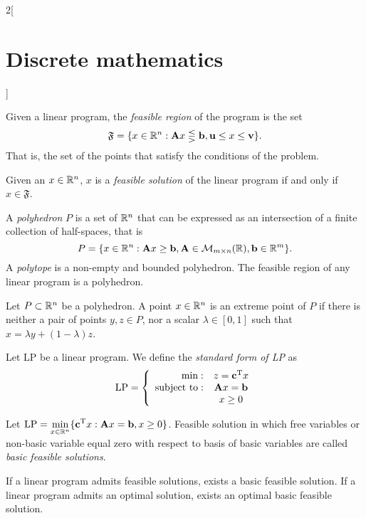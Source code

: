 \documentclass[../../../main.tex]{subfiles}
\begin{document}
\begin{multicols}{2}[\section{Discrete mathematics}]
    \begin{definition}
        Given a linear program, the \textit{feasible region} of the program is the set $$\mathfrak{F}=\{x\in\mathbb{R} ^n:\vb{A}x\lesseqgtr \vb{b},\vb{u}\leq x\leq \vb{v}\}.$$ That is, the set of the points that satisfy the conditions of the problem.
    \end{definition}
    \begin{prop}
        Given an $x\in\mathbb{R} ^n$, $x$ is a \textit{feasible solution} of the linear program if and only if $x\in\mathfrak{F}$.
    \end{prop}
    \begin{definition}
        A \textit{polyhedron} $P$ is a set of $\mathbb{R} ^n$ that can be expressed as an intersection of a finite collection of half-spaces, that is $$P=\{x\in\mathbb{R} ^n:\vb{A}x\geq \vb{b}, \vb{A}\in\mathcal{M}_{m\times n}(\mathbb{R} ),\vb{b}\in\mathbb{R} ^m\}.$$ A \textit{polytope} is a non-empty and bounded polyhedron. The feasible region of any linear program is a polyhedron.
    \end{definition}
    \begin{definition}
        Let $P\subset\mathbb{R} ^n$ be a polyhedron. A point $x\in\mathbb{R} ^n$ is an extreme point of $P$ if there is neither a pair of points $y,z\in P$, nor a scalar $\lambda\in[0,1]$ such that $x=\lambda y+(1-\lambda)z$.
    \end{definition}
    \begin{definition}
        Let LP be a linear program. We define the \textit{standard form of LP} as $$\text{LP}=\left\{
            \begin{array}{rc}
                \min:              & z=\vb{c}^{\mathrm{T}}x             \\
                \text{subject to}: & \vb{A}x=\vb{b} \\
                                   & x\geq 0
            \end{array}\right.$$
    \end{definition}
    \begin{definition}
        Let $\displaystyle \text{LP}=\min_{x\in\mathbb{R} ^n}\{\vb{c}^{\mathrm{T}}x:\vb{A}x=\vb{b},x\geq 0\}$. Feasible solution in which free variables or non-basic variable equal zero with respect to basis of basic variables are called \textit{basic feasible solutions}.
    \end{definition}
    \begin{prop}
        If a linear program admits feasible solutions, exists a basic feasible solution. If a linear program admits an optimal solution, exists an optimal basic feasible solution.

\end{prop}
\end{multicols}
\end{document}
